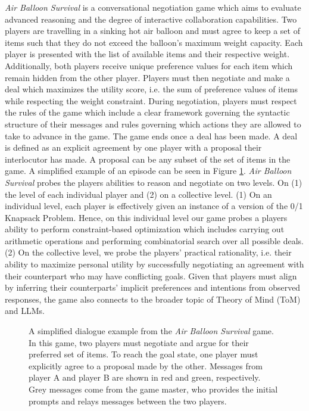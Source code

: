 \textit{Air Balloon Survival} is a conversational negotiation game which aims to evaluate advanced reasoning and the degree of interactive collaboration capabilities. Two players are travelling in a sinking hot air balloon and must agree to keep a set of items such that they do not exceed the balloon's maximum weight capacity. Each player is presented with the list of available items and their respective weight. Additionally, both players receive unique preference values for each item which remain hidden from the other player. Players must then negotiate and make a deal which maximizes the utility score, i.e. the sum of preference values of items while respecting the weight constraint. During negotiation, players must respect the rules of the game which include a clear framework governing the syntactic structure of their messages and rules governing which actions they are allowed to take to advance in the game. The game ends once a deal has been made. A deal is defined as an explicit agreement by one player with a proposal their interlocutor has made. A proposal can be any subset of the set of items in the game. A simplified example of an episode can be seen in Figure \ref{fig:air_balloon_example}. \textit{Air Balloon Survival} probes the players abilities to reason and negotiate on two levels. On (1) the level of each individual player and (2) on a collective level. (1) On an individual level, each player is effectively given an instance of a version of the 0/1 Knapsack Problem. Hence, on this individual level our game probes a players ability to perform constraint-based optimization which includes carrying out arithmetic operations and performing combinatorial search over all possible deals. (2) On the collective level, we probe the players’ practical rationality, i.e. their ability to maximize personal utility by successfully negotiating an agreement with their counterpart who may have conflicting goals. Given that players must align by inferring their counterparts’ implicit preferences and intentions from observed responses, the game also connects to the broader topic of Theory of Mind (ToM) and LLMs.
\begin{figure}[ht!]
    \centering
    
    \caption{A simplified dialogue example from the \textit{Air Balloon Survival} game. In this game, two players must negotiate and argue for their preferred set of items. To reach the goal state, one player must explicitly agree to a proposal made by the other. Messages from player A and player B are shown in red and green, respectively. Grey messages come from the game master, who provides the initial prompts and relays messages between the two players. }
    \label{fig:air_balloon_example}
\end{figure}
